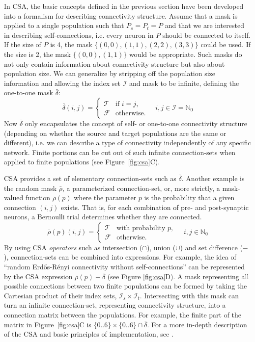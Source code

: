 \documentclass{frontiersSCNS} %
\newcommand{\Figure}[2]{Figure~\ref{#2}}
\newcommand{\Figure}[2]{Figure~#1}
\begin{document}
In CSA, the basic concepts defined in the previous section have been
developed into a formalism for describing connectivity structure.
Assume that a mask is applied to a single population such that $P_s =
P_t = P$ and that we are interested in describing self-connections,
i.e. every neuron in $P$ should be connected to itself.  If the size
of $P$ is 4, the mask $\{(0, 0), (1, 1), (2, 2), (3, 3)\}$ could be
used.  If the size is 2, the mask $\{(0, 0), (1, 1)\}$ would be
appropriate. Such masks do not only contain information about
connectivity structure but also about population size. We can
generalize by stripping off the population size information and
allowing the index set $\mathcal{I}$ and mask to be infinite, defining
the one-to-one mask $\bar{\delta}$:
\begin{equation}
  \bar{\delta}(i, j) =
      \begin{cases}
        \mathcal{T}& \text{if $i = j$},\\
        \mathcal{F}& \text{otherwise}.
      \end{cases}
      \quad i, j \in \mathcal{I} = \mathbb{N}_0
\end{equation}
Now $\bar{\delta}$ only encapsulates the concept of self- or
one-to-one connectivity structure (depending on whether the source and
target populations are the same or different), i.e. we can describe a
type of connectivity independently of any specific network.  Finite
portions can be cut out of such infinite connection-sets when applied
to finite populations (see \Figure{1}{fig:csa}C).

CSA provides a set of elementary connection-sets such as
$\bar{\delta}$. Another example is the random mask $\bar{\rho}$, a
parameterized connection-set, or, more strictly, a mask-valued
function $\bar{\rho}(p)$ where the parameter $p$ is the probability
that a given connection $(i, j)$ exists.  That is, for each
combination of pre- and post-synaptic neurons, a Bernoulli trial
determines whether they are connected.
\begin{equation}
  \bar{\rho} (p) (i, j) =
  \begin{cases}
    \mathcal{T}& \text{with probability $p$},\\
    \mathcal{F}& \text{otherwise}.
  \end{cases}
  \quad i, j \in \mathbb{N}_0
\end{equation}
By using CSA \emph{operators} such as intersection ($\cap$), union
($\cup$) and set difference ($-$), connection-sets can be combined into
expressions. For example, the idea of ``random Erd\H{o}s-R\'enyi
connectivity without self-connections'' can be represented by the CSA
expression $\bar{\rho}(p) - \bar{\delta}$ (see Figure
\ref{fig:csa}D). A mask representing all possible connections between
two finite populations can be formed by taking the Cartesian product
of their index sets, $\mathcal{I}_s \times
\mathcal{I}_t$. Intersecting with this mask can turn an infinite
connection-set, representing connectivity structure, into a connection
matrix between the populations. For example, the finite part of the
matrix in \Figure{1}{fig:csa}C is $\{0..6\} \times \{0..6\} \cap
\bar{\delta}$. For a more in-depth description of the CSA and basic
principles of implementation, see \citet{djurfeldt12}.
\end{document}
